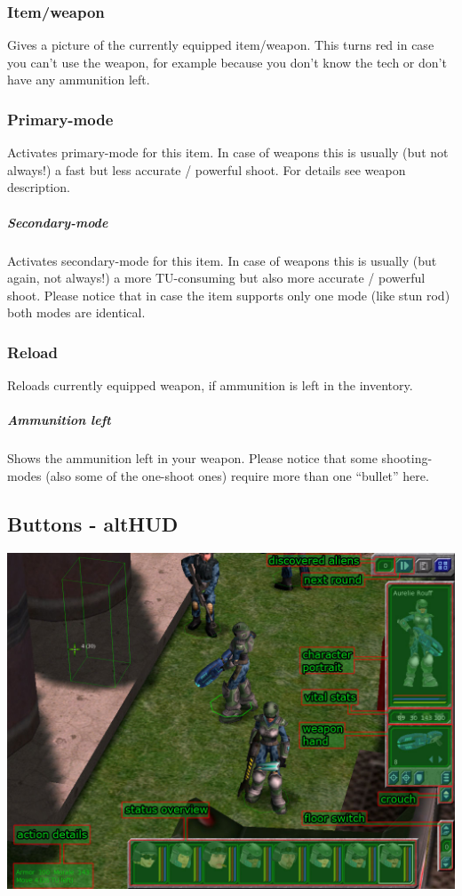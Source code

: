 \subsubsection{Item/weapon}
Gives a picture of the currently equipped item/weapon. This turns red in case you can't use the weapon, for example because you don't know the tech or don't have any ammunition left.
\subsubsection{Primary-mode}
Activates primary-mode for this item. In case of weapons this is usually (but not always!) a fast but less accurate / powerful shoot. For details see weapon description.
\subparagraph{Secondary-mode}
Activates secondary-mode for this item. In case of weapons this is usually (but again, not always!) a more TU-consuming but also more accurate / powerful shoot. Please notice that in case the item supports only one mode (like stun rod) both modes are identical.
\subsubsection{Reload}
Reloads currently equipped weapon, if ammunition is left in the inventory.
\subparagraph{Ammunition left}
Shows the ammunition left in your weapon. Please notice that some shooting-modes (also some of the one-shoot ones) require more than one ``bullet'' here.

\subsection{Buttons - altHUD}

\includegraphics[width=\textwidth]{images/altHUD_final.jpg}\\

